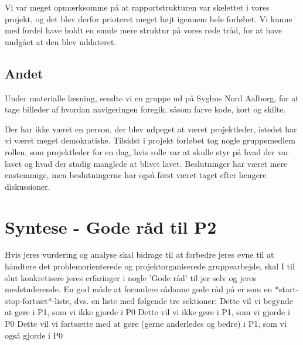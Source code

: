 \documentclass[a4paper,12pt, article]{memoir}
\begin{document}
        Vi var meget opmærksomme på at rapportstrukturen var skelettet i vores projekt, og det blev derfor prioteret meget højt igennem hele forløbet. Vi kunne med fordel have holdt en smule mere struktur på vores røde tråd, for at have undgået at den blev uddateret.


        \subsection{Andet}
        Under materialle læsning, sendte vi en gruppe ud på Syghus Nord Aalborg, for at tage billeder af hvordan navigeringen foregik, såsom farve kode, kort og skilte.

        Der har ikke været en person, der blev udpeget at været projektleder, istedet har vi været meget demokratiske. Tilsidst i projekt forløbet tog nogle gruppemedlem rollen, som projektleder for en dag, hvis rolle var at skulle styr på hvad der var lavet og hvad der stadig manglede at blivet lavet. Beslutninger har været mere enstemmige, men beslutningerne har også først været taget efter længere diskussioner.

    \section{Syntese - Gode råd til P2}
    Hvis jeres vurdering og analyse skal bidrage til at forbedre jeres evne til at håndtere det 
    problemorienterede og projektorganiserede gruppearbejde, skal I til slut konkretisere jeres 
    erfaringer i nogle ’Gode råd’ til jer selv og jeres medstuderende. En god måde at formulere sådanne 
    gode råd på er som en *start-stop-fortsæt*-liste, dvs. en liste med følgende tre sektioner: 
    Dette vil vi begynde at gøre i P1, som vi ikke gjorde i P0 
    Dette vil vi ikke gøre i P1, som vi gjorde i P0 
    Dette vil vi fortsætte med at gøre (gerne anderledes og bedre) i P1, som vi også gjorde i P0 
\end{document}
